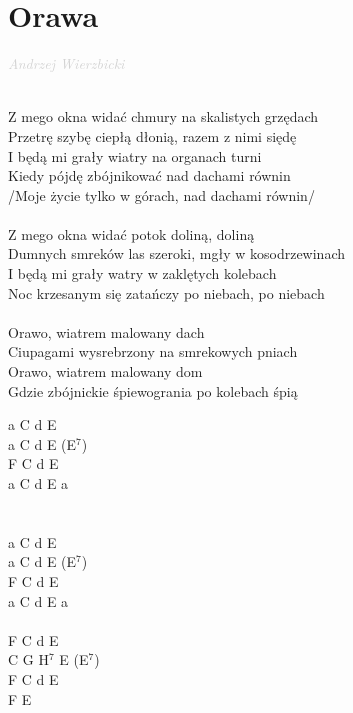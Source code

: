 \documentclass[a5paper, 10pt]{book}
\begin{document}
\section{Orawa}\textcolor{lightgray}{\textit{Andrzej Wierzbicki}}\\~\\
\begin{minipage}[t]{0.8\textwidth}
  Z mego okna widać chmury na skalistych grzędach\\
  Przetrę szybę ciepłą dłonią, razem z nimi siędę	\\
  I będą mi grały wiatry na organach turni\\
  Kiedy pójdę zbójnikować nad dachami równin		\\
  /Moje życie tylko w górach, nad dachami równin/\\
  \\
  Z mego okna widać potok doliną, doliną\\
  Dumnych smreków las szeroki, mgły w kosodrzewinach\\
  I będą mi grały watry w zaklętych kolebach\\
  Noc krzesanym się zatańczy po niebach, po niebach\\
  \\
  \hspace*{5mm}Orawo, wiatrem malowany dach				\\
  \hspace*{5mm}Ciupagami wysrebrzony na smrekowych pniach\\
  \hspace*{5mm}Orawo, wiatrem malowany dom				\\
  \hspace*{5mm}Gdzie zbójnickie śpiewogrania po kolebach śpią\\

\end{minipage}
\begin{minipage}[t]{0.2\textwidth}
  a C d  E\\
  a C d E (E$^7$)\\
  F C d  E\\
  a C d E a\\
  \\
  \\
  a C d  E\\
  a C d E (E$^7$)\\
  F C d  E\\
  a C d E a\\
  \\
  F C d E\\
  C G H$^7$ E (E$^7$)\\
  F C d  E\\
  F E \\
\end{minipage}
\end{document}

